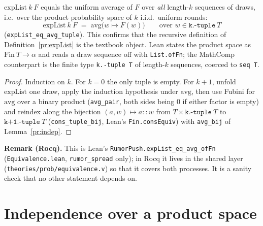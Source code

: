 \begin{theorem}\label{pr:faithful}
  \rocqok
  $\mathrm{expList}\ k\ F$ equals the uniform average of $F$ over
  \emph{all} length-$k$ sequences of draws, i.e.\ over the product
  probability space of $k$ i.i.d.\ uniform rounds:
  \[
    \mathrm{expList}\ k\ F \;=\; \mathrm{avg}\bigl(w \mapsto F(w)\bigr)
    \qquad \text{over } w \in \texttt{k.-tuple}\ T
  \]
  (\texttt{expList\_eq\_avg\_tuple}). This confirms that the recursive
  definition of Definition~\ref{pr:expList} is the textbook object. Lean
  states the product space as $\mathrm{Fin}\ T \to \alpha$ and reads a draw
  sequence off with \texttt{List.ofFn}; the MathComp counterpart is the
  finite type \texttt{k.-tuple T} of length-$k$ sequences, coerced to
  \texttt{seq T}.
\end{theorem}
\begin{proof}
  \rocqok
  Induction on $k$. For $k = 0$ the only tuple is empty. For $k + 1$, unfold
  $\mathrm{expList}$ one draw, apply the induction hypothesis under
  $\mathrm{avg}$, then use Fubini for $\mathrm{avg}$ over a binary product
  (\texttt{avg\_pair}, both sides being $0$ if either factor is empty) and
  reindex along the bijection $(a, w) \mapsto a :: w$ from
  $T \times \texttt{k.-tuple}\ T$ to $\texttt{k+1.-tuple}\ T$
  (\texttt{cons\_tuple\_bij}, Lean's \texttt{Fin.consEquiv}) with
  \texttt{avg\_bij} of Lemma~\ref{pr:indep}.
\end{proof}

\noindent\textbf{Remark (Rocq).} This is Lean's
\texttt{RumorPush.expList\_eq\_avg\_ofFn} (\texttt{Equivalence.lean},
\texttt{rumor\_spread} only); in Rocq it lives in the shared layer
(\texttt{theories/prob/equivalence.v}) so that it covers both processes. It
is a sanity check that no other statement depends on.

\section{Independence over a product space}\label{pr:sec:indep}

